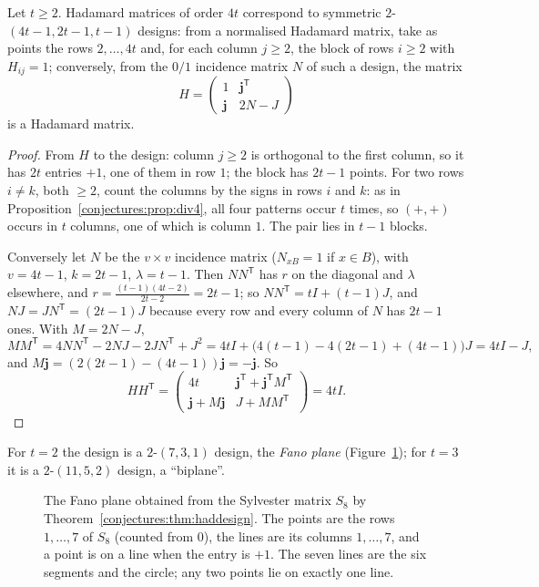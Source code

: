 \begin{theorem}\label{conjectures:thm:haddesign}
Let $t\ge2$. Hadamard matrices of order $4t$ correspond to symmetric $2$-$(4t-1,2t-1,t-1)$ designs: from a normalised Hadamard matrix, take as points
the rows $2,\dots,4t$ and, for each column $j\ge2$, the block of rows $i\ge2$ with $H_{ij}=1$; conversely, from the $0/1$ incidence matrix $N$ of such a
design, the matrix
\[
H=\begin{pmatrix}1&\mathbf j^{\mathsf T}\\\mathbf j&2N-J\end{pmatrix}
\]
is a Hadamard matrix.
\end{theorem}
\begin{proof}
From $H$ to the design: column $j\ge2$ is orthogonal to the first column, so it has $2t$ entries $+1$, one of them in row $1$; the block has $2t-1$
points. For two rows $i\neq k$, both $\ge2$, count the columns by the signs in rows $i$ and $k$: as in Proposition~\ref{conjectures:prop:div4}, all four patterns
occur $t$ times, so $(+,+)$ occurs in $t$ columns, one of which is column $1$. The pair lies in $t-1$ blocks.

Conversely let $N$ be the $v\times v$ incidence matrix ($N_{xB}=1$ if $x\in B$), with $v=4t-1$, $k=2t-1$, $\lambda=t-1$. Then $NN^{\mathsf T}$ has
$r$ on the diagonal and $\lambda$ elsewhere, and $r=\frac{(t-1)(4t-2)}{2t-2}=2t-1$; so $NN^{\mathsf T}=tI+(t-1)J$, and $NJ=JN^{\mathsf T}=(2t-1)J$
because every row and every column of $N$ has $2t-1$ ones. With $M=2N-J$,
\[
MM^{\mathsf T}=4NN^{\mathsf T}-2NJ-2JN^{\mathsf T}+J^2=4tI+\bigl(4(t-1)-4(2t-1)+(4t-1)\bigr)J=4tI-J,
\]
and $M\mathbf j=(2(2t-1)-(4t-1))\mathbf j=-\mathbf j$. So
\[
HH^{\mathsf T}=\begin{pmatrix}4t&\mathbf j^{\mathsf T}+\mathbf j^{\mathsf T}M^{\mathsf T}\\\mathbf j+M\mathbf j&J+MM^{\mathsf T}\end{pmatrix}=4tI.
\]
\end{proof}

For $t=2$ the design is a $2$-$(7,3,1)$ design, the \emph{Fano plane} (Figure~\ref{conjectures:fig:fano}); for $t=3$ it is a $2$-$(11,5,2)$ design, a ``biplane''.

\begin{figure}[ht]
\centering
{}
\caption{The Fano plane obtained from the Sylvester matrix $S_8$ by Theorem~\ref{conjectures:thm:haddesign}. The points are the rows $1,\dots,7$ of $S_8$ (counted
from $0$), the lines are its columns $1,\dots,7$, and a point is on a line when the entry is $+1$. The seven lines are the six segments and the
circle; any two points lie on exactly one line.}
\label{conjectures:fig:fano}
\end{figure}

